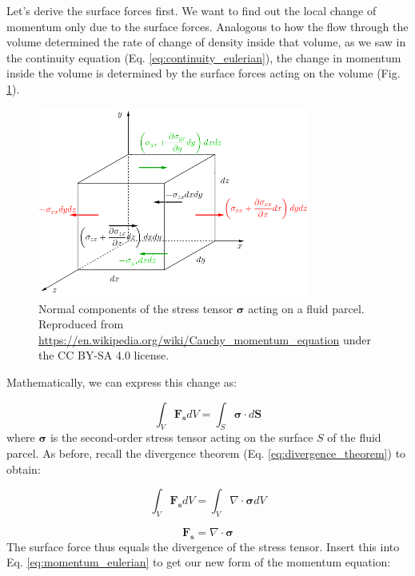 \documentclass[12pt]{article}
\numberwithin{equation}{section}
\numberwithin{figure}{section}
\numberwithin{table}{section}
\begin{document}
Let's derive the surface forces first.
We want to find out the local change of momentum only due to the surface forces.
Analogous to how the flow through the volume determined the rate of change of
density inside that volume, as we saw in the continuity equation
(Eq. \ref{eq:continuity_eulerian}), the change in momentum inside the volume
is determined by the surface forces acting on the volume (Fig. \ref{fig:momentum1}).

\begin{figure}[h]
  \centering
  \includegraphics[width=0.8\textwidth]{assets/fig_momentum1.png}
  \caption{
    Normal components of the stress tensor $\mathbf{\sigma}$ acting on a fluid parcel.
    Reproduced from \url{https://en.wikipedia.org/wiki/Cauchy_momentum_equation}
    under the CC BY-SA 4.0 license.
  }
  \label{fig:momentum1}
\end{figure}

Mathematically, we can express this change as:

\begin{equation}
  \int_V \mathbf{F_s} dV = \int_S \boldsymbol{\sigma} \cdot d\mathbf{S}
\end{equation}
where $\boldsymbol{\sigma}$ is the second-order stress tensor acting on the
surface $S$ of the fluid parcel.
As before, recall the divergence theorem (Eq. \ref{eq:divergence_theorem}) to obtain:

\begin{equation}
  \int_V \mathbf{F_s} dV = \int_V \nabla \cdot \boldsymbol{\sigma} dV
\end{equation}

\begin{equation}
  \mathbf{F_s} = \nabla \cdot \boldsymbol{\sigma}
\end{equation}
The surface force thus equals the divergence of the stress tensor.
Insert this into Eq. \ref{eq:momentum_eulerian} to get our new form of
the momentum equation:
\end{document}
